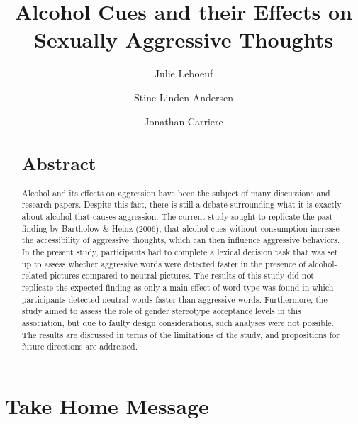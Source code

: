 \documentclass[serif, twocolumn, numeric, empirical]{jote-article}
\title{Alcohol Cues and their Effects on Sexually Aggressive Thoughts}
\author[1]{Julie Leboeuf}
\author[1]{Stine Linden-Andersen}
\author[1]{Jonathan Carriere}
\affil[1]{Department of Psychology, Bishop’s University, Sherbrooke, Quebec, J1M 1Z7, Canada}
\begin{document}
\begin{frontmatter}
\maketitle
{}
\begin{abstract}
\section*{Abstract}

\noindent Alcohol and its effects on aggression have been the subject of many discussions and research papers. Despite this fact, there is still a debate surrounding what it is exactly about alcohol that causes aggression. The current study sought to replicate the past finding by Bartholow \& Heinz (2006), that alcohol cues without consumption increase the accessibility of aggressive thoughts, which can then influence aggressive behaviors. In the present study, participants had to complete a lexical decision task that was set up to assess whether aggressive words were detected faster in the presence of alcohol-related pictures compared to neutral pictures. The results of this study did not replicate the expected finding as only a main effect of word type was found in which participants detected neutral words faster than aggressive words. Furthermore, the study aimed to assess the role of gender stereotype acceptance levels in this association, but due to faulty design considerations, such analyses were not possible. The results are discussed in terms of the limitations of the study, and propositions for future directions are addressed. 

\end{abstract}
\end{frontmatter}

{}
\section*{Take Home Message} %
\label{sec:take-home}
\end{document}
